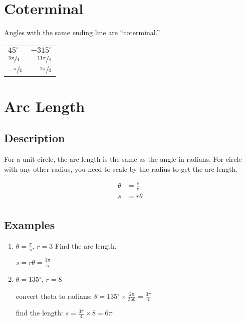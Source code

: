 \documentclass{exam}
\newcommand{\dg}{\ensuremath{^\circ}}
\begin{document}
  \section{Coterminal}
  Angles with the same ending line are ``coterminal.''

  \begin{tabular}[H]{lr}
    \toprule
    $45 \dg$             & $-315 \dg$ \\
    $\sfrac{3 \pi}{4}$   & $\sfrac{11 \pi}{4}$ \\
    $- \sfrac{\pi}{4}$   & $\sfrac{7 \pi}{4}$ \\
    \bottomrule
  \end{tabular}

  \section{Arc Length}

  \subsection{Description}
  For a unit circle, the arc length is the same as the angle in radians.  For circle with any other radius, you need to
  scale by the radius to get the arc length.

  \begin{align*}
    \theta & = \frac{s}{r} \\
    s      & = r \theta \\
  \end{align*}


  \subsection{Examples}
  \begin{enumerate}
    \item $\theta = \frac{\pi}{5}$, $r = 3$  Find the arc length.
      \begin{solution}
        $s = r \theta = \frac{3 \pi}{5}$
      \end{solution}

    \item $\theta = 135 \dg$, $r = 8$
      \begin{solution}
        convert theta to radians: $\theta = 135 \dg \times \frac{2 \pi}{360} = \frac{3 \pi}{4}$

        find the length: $s = \frac{3 \pi}{4} \times 8 = 6 \pi$
      \end{solution}

  \end{enumerate}
\end{document}
